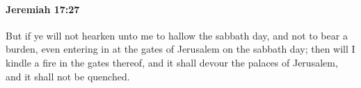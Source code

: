 
		\paragraph{Jeremiah 17:27} %
			\label{JEREMIAH-17-27}

			But if ye will not hearken unto me to hallow the sabbath day, and not to bear a burden, even entering in at the gates of Jerusalem on the sabbath day; then will I kindle a fire in the gates thereof, and it shall devour the palaces of Jerusalem, and it shall not be quenched.

